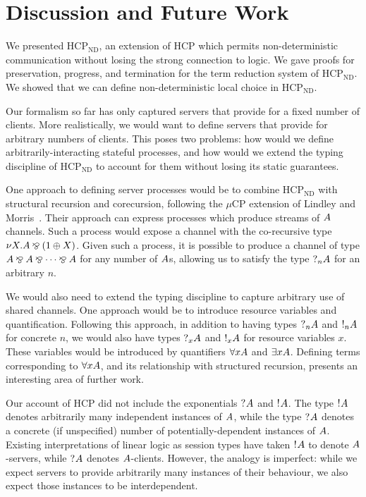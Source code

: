 \documentclass{lmcs}
\providecommand{\ty}[1]{\textcolor{tycolor}{\ensuremath{\normalfont#1}}}
\providecommand{\hcp}{\ensuremath{\text{HCP}}\xspace}
\providecommand{\nodcap}{\ensuremath{\hcp_{\text{ND}}}\xspace}
\providecommand{\parr}{\mathbin{\bindnasrepma}}
\providecommand{\plus}{\ensuremath{\oplus}}
\providecommand{\give}[2][]{\ensuremath{{ ? }_{#1}{#2}}}
\providecommand{\take}[2][]{\ensuremath{{ ! }_{#1}{#2}}}
\begin{document}
\section{Discussion and Future Work}\label{sec:conclusion}
We presented \nodcap, an extension of \hcp which permits non-deterministic communication without losing the strong connection to logic. We gave proofs for preservation, progress, and termination for the term reduction system of \nodcap. We showed that we can define non-deterministic local choice in \nodcap.

Our formalism so far has only captured servers that provide for a fixed number of clients.  More realistically, we would want to define servers that provide for arbitrary numbers of clients.  This poses two problems: how would we define arbitrarily-interacting stateful processes, and how would we extend the typing discipline of \nodcap to account for them without losing its static guarantees.

One approach to defining server processes would be to combine \nodcap with structural recursion and corecursion, following the $\mu\text{CP}$ extension of Lindley and Morris~\cite{lindley2016}.  Their approach can express processes which produce streams of \ty{A} channels. Such a process would expose a channel with the co-recursive type \ty{\nu X. A \parr (1 \plus X)}.  Given such a process, it is possible to produce a channel of type \ty{A \parr A \parr \cdots \parr A} for any number of \ty{A}s, allowing us to satisfy the type \ty{\give[n]{A}} for an arbitrary $n$.

We would also need to extend the typing discipline to capture arbitrary use of shared channels.  One approach would be to introduce resource variables and quantification.  Following this approach, in addition to having types \ty{\give[n] A} and \ty{\take[n] A} for concrete $n$, we would also have types \ty{\give[x] A} and \ty{\take[x] A} for resource variables $x$.  These variables would be introduced by quantifiers \ty{\forall x A} and \ty{\exists x A}. Defining terms corresponding to \ty{\forall x A}, and its relationship with structured recursion, presents an interesting area of further work.

Our account of \hcp did not include the exponentials \ty{\give A} and \ty{\take A}. The type \ty{\take A} denotes arbitrarily many independent instances of \ty{A}, while the type \ty{\give A} denotes a concrete (if unspecified) number of potentially-dependent instances of \ty{A}.  Existing interpretations of linear logic as session types have taken \ty{\take A} to denote \ty{A}-servers, while \ty{\give A} denotes \ty{A}-clients.  However, the analogy is imperfect: while we expect servers to provide arbitrarily many instances of their behaviour, we also expect those instances to be interdependent.
\end{document}
